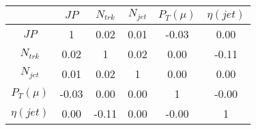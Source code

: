 \begin{tabular}{|c|c|c|c|c|c|} 
\hline
 & $JP$ & $N_{trk}$ & $N_{jet}$ & $P_{T} (\mu)$ & $\eta (jet)$ \\ \hline
$JP$ & 1 & 0.02 & 0.01 & -0.03 & 0.00 \\
$N_{trk}$ & 0.02 & 1 & 0.02 & 0.00 & -0.11 \\
$N_{jet}$ & 0.01 & 0.02 & 1 & 0.00 & 0.00 \\
$P_{T} (\mu)$ & -0.03 & 0.00 & 0.00 & 1 & -0.00 \\
$\eta (jet)$ & 0.00 & -0.11 & 0.00 & -0.00 & 1 \\
\hline 
\end{tabular} 


